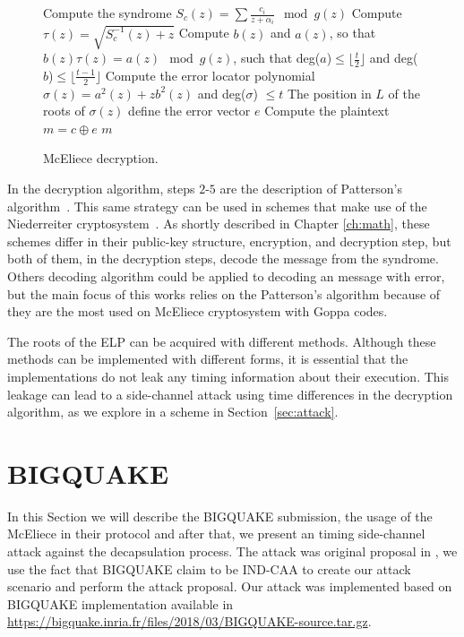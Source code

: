 \begin{figure}[ht]
\centering
    \begin{algorithm}[H]
     Compute the syndrome $S_c(z) = \sum{\frac{c_i}{z+\alpha_i}} \mod g(z)$\;
     Compute $\tau(z) = \sqrt{S^{-1}_{c}(z)+z}$\;
     Compute $b(z)$ and $a(z)$, so that $b(z)\tau(z) = a(z) \mod g(z)$, such that deg($a$)$\leq \lfloor \frac{t}{2} \rfloor$ and deg($b$)$\leq \lfloor \frac{t-1}{2} \rfloor$\;
     Compute the error locator polynomial $\sigma(z) = a^2(z) + zb^2(z)$ and deg($\sigma$) $\leq t$\;
     The position in $L$ of the roots of $\sigma(z)$ define the error vector $e$\;
     Compute the plaintext $m = c \oplus e$\;
     \Return $m$\;
     \caption{McEliece decryption.}\label{alg:3}
    \end{algorithm}
\end{figure}


In the decryption algorithm, steps $2$-$5$ are the description of Patterson's algorithm~\cite{patterson1975algebraic}. This same strategy can be used in schemes that make use of the Niederreiter cryptosystem~\cite{niederreiter}. As shortly described in Chapter \ref{ch:math}, these schemes differ in their public-key structure, encryption, and decryption step, but both of them, in the decryption steps, decode the message from the syndrome. Others decoding algorithm could be applied to decoding an message with error, but the main focus of this works relies on the Patterson's algorithm because of they are the most used on McEliece cryptosystem with Goppa codes. 

The roots of the ELP can be acquired with different methods. Although these methods can be implemented with different forms, it is essential that the implementations do not leak any timing information about their execution. This leakage can lead to a side-channel attack using time differences in the decryption algorithm, as we explore in a scheme in Section~\ref{sec:attack}.

\section{BIGQUAKE}
In this Section we will describe the BIGQUAKE submission, the usage of the McEliece in their protocol and after that, we present an timing side-channel attack against the decapsulation process. The attack was original proposal in \cite{shoufan2009timing}, we use the fact that BIGQUAKE claim to be IND-CAA to create our attack scenario and perform the attack proposal. Our attack was implemented based on BIGQUAKE implementation available in \url{https://bigquake.inria.fr/files/2018/03/BIGQUAKE-source.tar.gz}.

